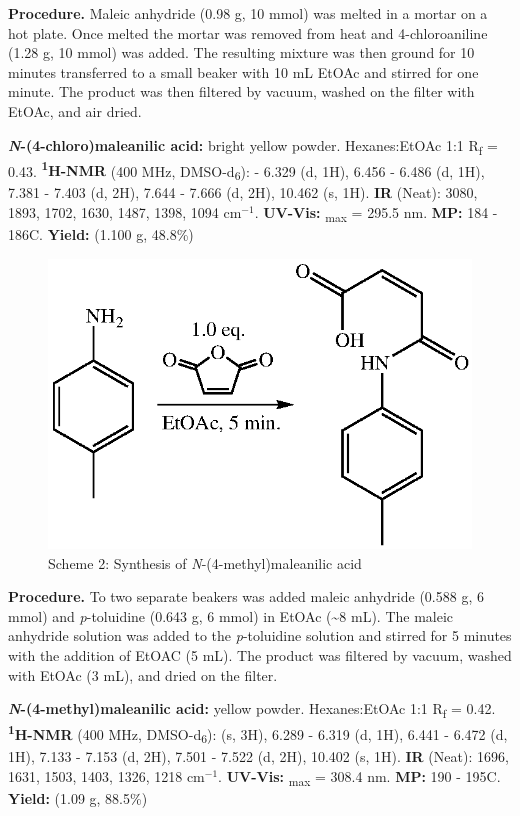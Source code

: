 \documentclass[11pt]{article}
\let\bf\textbf
\begin{document}
\bf{Procedure.} Maleic anhydride (0.98 g, 10 mmol) was melted in a mortar on a hot plate. Once melted the mortar was removed from heat and 4-chloroaniline (1.28 g, 10 mmol) was added. The resulting mixture was then ground for 10 minutes transferred to a small beaker with 10 mL EtOAc and stirred for one minute. The product was then filtered by vacuum, washed on the filter with EtOAc, and air dried.

\bf{\textit{N}-(4-chloro)maleanilic acid:} bright yellow powder. Hexanes:EtOAc 1:1 R\textsubscript{f} = 0.43. \bf{\textsuperscript{1}H-NMR} (400 MHz, DMSO-d\textsubscript{6}): \textdelta{} - 6.329 (d, 1H), 6.456 - 6.486 (d, 1H), 7.381 - 7.403 (d, 2H), 7.644 - 7.666 (d, 2H), 10.462 (s, 1H). \bf{IR} (Neat): 3080, 1893, 1702, 1630, 1487, 1398, 1094 cm$^{-1}$. \bf{UV-Vis:} \textlambda\textsubscript{max} = 295.5 nm. \bf{MP:} 184 - 186\degree C. \bf{Yield:} (1.100 g, 48.8\%)

\begin{figure}[H]
    \centering
    \includegraphics[scale=0.8]{schemes/scheme1.2.eps}
    \caption*{Scheme 2: Synthesis of \textit{N}-(4-methyl)maleanilic acid}
\end{figure}

\bf{Procedure.} To two separate beakers was added maleic anhydride (0.588 g, 6 mmol) and \textit{p}-toluidine (0.643 g, 6 mmol) in EtOAc (\textasciitilde 8 mL). The maleic anhydride solution was added to the \textit{p}-toluidine solution and stirred for 5 minutes with the addition of EtOAC (5 mL). The product was filtered by vacuum, washed with EtOAc (3 mL), and dried on the filter.

\bf{\textit{N}-(4-methyl)maleanilic acid:} yellow powder. Hexanes:EtOAc 1:1 R\textsubscript{f} = 0.42. \bf{\textsuperscript{1}H-NMR} (400 MHz, DMSO-d\textsubscript{6}): \textdelta{} (s, 3H), 6.289 - 6.319 (d, 1H), 6.441 - 6.472 (d, 1H), 7.133 - 7.153 (d, 2H), 7.501 - 7.522 (d, 2H), 10.402 (s, 1H). \bf{IR} (Neat): 1696, 1631, 1503, 1403, 1326, 1218 cm$^{-1}$. \bf{UV-Vis:} \textlambda\textsubscript{max} = 308.4 nm. \bf{MP:} 190 - 195\degree C. \bf{Yield:} (1.09 g, 88.5\%)
\end{document}
